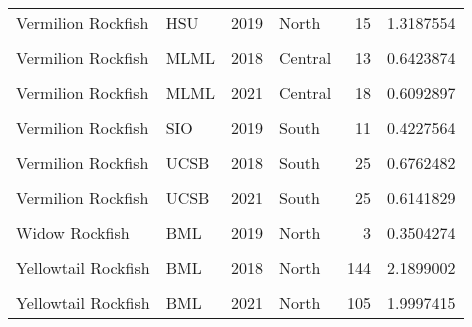 \documentclass[
]{article}
\begin{document}
\begin{longtable}[t]{llrlrr}
Vermilion Rockfish & HSU & 2019 & North & 15 & 1.3187554\\
\cellcolor{gray!6}{Vermilion Rockfish} & \cellcolor{gray!6}{HSU} & \cellcolor{gray!6}{2021} & \cellcolor{gray!6}{North} & \cellcolor{gray!6}{22} & \cellcolor{gray!6}{1.2659485}\\
Vermilion Rockfish & MLML & 2018 & Central & 13 & 0.6423874\\
\cellcolor{gray!6}{Vermilion Rockfish} & \cellcolor{gray!6}{MLML} & \cellcolor{gray!6}{2019} & \cellcolor{gray!6}{Central} & \cellcolor{gray!6}{29} & \cellcolor{gray!6}{0.5419987}\\
\addlinespace
Vermilion Rockfish & MLML & 2021 & Central & 18 & 0.6092897\\
\cellcolor{gray!6}{Vermilion Rockfish} & \cellcolor{gray!6}{SIO} & \cellcolor{gray!6}{2018} & \cellcolor{gray!6}{South} & \cellcolor{gray!6}{6} & \cellcolor{gray!6}{0.5041209}\\
Vermilion Rockfish & SIO & 2019 & South & 11 & 0.4227564\\
\cellcolor{gray!6}{Vermilion Rockfish} & \cellcolor{gray!6}{SIO} & \cellcolor{gray!6}{2021} & \cellcolor{gray!6}{South} & \cellcolor{gray!6}{11} & \cellcolor{gray!6}{1.0384615}\\
Vermilion Rockfish & UCSB & 2018 & South & 25 & 0.6762482\\
\addlinespace
\cellcolor{gray!6}{Vermilion Rockfish} & \cellcolor{gray!6}{UCSB} & \cellcolor{gray!6}{2019} & \cellcolor{gray!6}{South} & \cellcolor{gray!6}{12} & \cellcolor{gray!6}{0.7957875}\\
Vermilion Rockfish & UCSB & 2021 & South & 25 & 0.6141829\\
\cellcolor{gray!6}{Widow Rockfish} & \cellcolor{gray!6}{BML} & \cellcolor{gray!6}{2018} & \cellcolor{gray!6}{North} & \cellcolor{gray!6}{6} & \cellcolor{gray!6}{0.7979798}\\
Widow Rockfish & BML & 2019 & North & 3 & 0.3504274\\
\cellcolor{gray!6}{Widow Rockfish} & \cellcolor{gray!6}{HSU} & \cellcolor{gray!6}{2018} & \cellcolor{gray!6}{North} & \cellcolor{gray!6}{1} & \cellcolor{gray!6}{1.0714286}\\
\addlinespace
Yellowtail Rockfish & BML & 2018 & North & 144 & 2.1899002\\
\cellcolor{gray!6}{Yellowtail Rockfish} & \cellcolor{gray!6}{BML} & \cellcolor{gray!6}{2019} & \cellcolor{gray!6}{North} & \cellcolor{gray!6}{69} & \cellcolor{gray!6}{1.2739839}\\
Yellowtail Rockfish & BML & 2021 & North & 105 & 1.9997415\\

\end{longtable}
\end{document}
